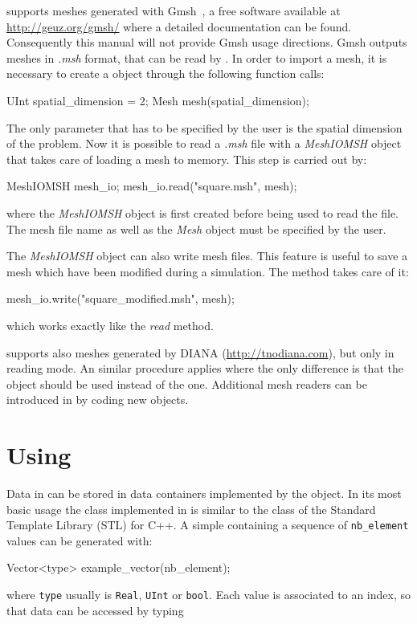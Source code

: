 \akantu supports meshes generated with Gmsh~\cite{gmsh}, a free
software available at \url{http://geuz.org/gmsh/} where a detailed 
documentation can be found. Consequently this manual will not provide
Gmsh usage directions. Gmsh outputs meshes in \textit{.msh} format, that can be read
by \akantu. In order to import a mesh, it is necessary to create
a  object through the following function calls:
\begin{cpp}
  UInt spatial_dimension = 2;
  Mesh mesh(spatial_dimension);
\end{cpp}
The only parameter that has to be specified by the user is the spatial
dimension of the problem. Now it is possible to read a \textit{.msh} file with
a \textit{MeshIOMSH} object that takes care of loading a mesh to memory. 
This step is carried out by:
\begin{cpp}
  MeshIOMSH mesh_io;
  mesh_io.read("square.msh", mesh);
\end{cpp}
where the \textit{MeshIOMSH} object is first created before being 
used to read the  file. The mesh file name as well as the \textit{Mesh}
object must be specified by the user. 

The \textit{MeshIOMSH} object can also write mesh files. This
feature is useful to save a mesh which have been modified during a
simulation. The  method takes care of it:
\begin{cpp}
  mesh_io.write("square_modified.msh", mesh);
\end{cpp}
which works exactly like the \textit{read} method.

\akantu supports also meshes generated by
DIANA (\url{http://tnodiana.com}), but only in reading mode. An similar
procedure applies where the only
difference is that the  object should be used
instead of the  one. Additional mesh readers can be
introduced in \akantu by coding new  objects.

\section{Using }

Data in \akantu can be stored in data containers implemented by
the  object. In its most basic usage the  class
implemented in \akantu is similar to the  class of
the Standard Template Library (STL) for C++. A simple 
containing a sequence of \texttt{nb\_element} values can be generated with:
\begin{cpp}
  Vector<type> example_vector(nb_element);
\end{cpp}
where \texttt{type} usually is \texttt{Real}, \texttt{UInt} or
\texttt{bool}. Each value is associated to an index, so that data can be
accessed by typing

